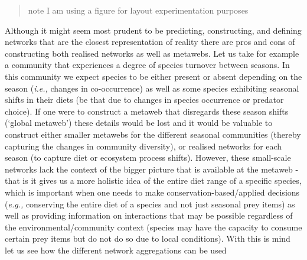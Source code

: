 \documentclass[
]{article}
\begin{document}
\begin{tcolorbox}[enhanced jigsaw, bottomrule=.15mm, coltitle=black, colbacktitle=quarto-callout-note-color!10!white, arc=.35mm, rightrule=.15mm, breakable, opacityback=0, left=2mm, colframe=quarto-callout-note-color-frame, bottomtitle=1mm, toprule=.15mm, leftrule=.75mm, titlerule=0mm, title=\textcolor{quarto-callout-note-color}{\faInfo}\hspace{0.5em}{Box 1 - Why we need to aggregate networks at different scales: A
hypothetical case study}, toptitle=1mm, colback=white, opacitybacktitle=0.6]

\begin{quote}
note I am using a figure for layout experimentation purposes
\end{quote}

Although it might seem most prudent to be predicting, constructing, and
defining networks that are the closest representation of reality there
are pros and cons of constructing both realised networks as well as
metawebs. Let us take for example a community that experiences a degree
of species turnover between seasons. In this community we expect species
to be either present or absent depending on the season (\emph{i.e.,}
changes in co-occurrence) as well as some species exhibiting seasonal
shifts in their diets (be that due to changes in species occurrence or
predator choice). If one were to construct a metaweb that disregards
these season shifts (`global metaweb') these details would be lost and
it would be valuable to construct either smaller metawebs for the
different seasonal communities (thereby capturing the changes in
community diversity), or realised networks for each season (to capture
diet or ecosystem process shifts). However, these small-scale networks
lack the context of the bigger picture that is available at the metaweb
- that is it gives us a more holistic idea of the entire diet range of a
specific species, which is important when one needs to make
conservation-based/applied decisions (\emph{e.g.,} conserving the entire
diet of a species and not just seasonal prey items) as well as providing
information on interactions that may be possible regardless of the
environmental/community context (species may have the capacity to
consume certain prey items but do not do so due to local conditions).
With this is mind let us see how the different network aggregations can
be used

\begin{figure}[H]

\centering{

}
\end{figure}
\end{tcolorbox}
\end{document}
